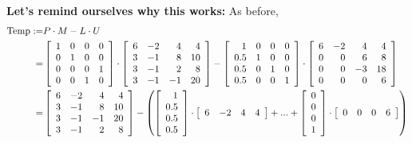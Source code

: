 \begin{tcolorbox}
\textbf{Let's remind ourselves why this works:} As before,
\begin{align*}
    {\rm Temp} :=& P \cdot M - L \cdot U \\
    =& \left[\begin{array}{rrrr} 1 & 0 & 0 & 0\\ 0 & 1 & 0 & 0 \\ 0 & 0 & 0 & 1 \\0 & 0 & 1 & 0\end{array}\right] \cdot \left[\begin{array}{rrrr} 6 & -2 & 4 & 4\\ 3 & -1 & 8 & 10 \\ 3 & -1 & 2 & 8 \\3 & -1 & -1 & 20 \end{array}\right]
    - \left[ \begin{array}{rrrr} 1 & 0 & 0 & 0\\ 0.5 & 1 & 0 & 0 \\ 0.5 & 0 & 1 & 0 \\ 0.5 & 0 & 0 & 1  \end{array} \right] \cdot \left[ \begin{array}{rrrr} 6 & -2 & 4 & 4 \\ 0 & 0 & 6 & 8 \\ 0 & 0 & -3 & 18 \\ 0 & 0 & 0 & 6  \end{array} \right] \\
    =& \left[\begin{array}{rrrr} 6 & -2 & 4 & 4\\ 3 & -1 & 8 & 10 \\ 3 & -1 & -1 & 20 \\ 3 & -1 & 2 & 8 \end{array}\right] 
    - \left( \left[ \begin{array}{r} 1 \\ 0.5 \\ 0.5 \\0.5 \end{array} \right] \cdot \left[ \begin{array}{rrrr} 6 & -2 & 4 & 4 \end{array} \right] + ... + \left[ \begin{array}{r} 0 \\ 0 \\ 0 \\ 1 \end{array} \right] \cdot \left[ \begin{array}{rrrr} 0 & 0 & 0 & 6 \end{array} \right] \right) \\

\end{align*}
\end{tcolorbox}
